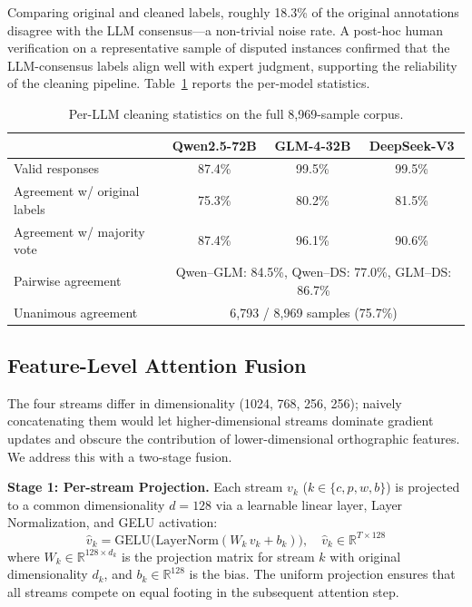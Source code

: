 ﻿\documentclass[12pt]{article}
\begin{document}
Comparing original and cleaned labels, roughly 18.3\% of the original annotations disagree with the LLM consensus---a non-trivial noise rate. A post-hoc human verification on a representative sample of disputed instances confirmed that the LLM-consensus labels align well with expert judgment, supporting the reliability of the cleaning pipeline. Table~\ref{tab:llm-stats} reports the per-model statistics.

\begin{table}[htbp]
\centering
\caption{Per-LLM cleaning statistics on the full 8{,}969-sample corpus.}
\label{tab:llm-stats}
\begin{tabular}{lccc}
\toprule
 & Qwen2.5-72B & GLM-4-32B & DeepSeek-V3 \\
\midrule
Valid responses & 87.4\% & 99.5\% & 99.5\% \\
Agreement w/ original labels & 75.3\% & 80.2\% & 81.5\% \\
Agreement w/ majority vote & 87.4\% & 96.1\% & 90.6\% \\
\midrule
Pairwise agreement & \multicolumn{3}{c}{Qwen--GLM: 84.5\%, Qwen--DS: 77.0\%, GLM--DS: 86.7\%} \\
Unanimous agreement & \multicolumn{3}{c}{6{,}793 / 8{,}969 samples (75.7\%)} \\
\bottomrule
\end{tabular}
\end{table}
\subsection{Feature-Level Attention Fusion}
\label{sec:attention-fusion}
The four streams differ in dimensionality (1024, 768, 256, 256); naively concatenating them would let higher-dimensional streams dominate gradient updates and obscure the contribution of lower-dimensional orthographic features. We address this with a two-stage fusion.

\textbf{Stage 1: Per-stream Projection.} Each stream $v_k$ ($k \in \{c, p, w, b\}$) is projected to a common dimensionality $d = 128$ via a learnable linear layer, Layer Normalization, and GELU activation:
\[
\hat{v}_k = \mathrm{GELU}\bigl(\mathrm{LayerNorm}(W_k \, v_k + b_k)\bigr), \quad \hat{v}_k \in \mathbb{R}^{T \times 128}
\]
where $W_k \in \mathbb{R}^{128 \times d_k}$ is the projection matrix for stream $k$ with original dimensionality $d_k$, and $b_k \in \mathbb{R}^{128}$ is the bias. The uniform projection ensures that all streams compete on equal footing in the subsequent attention step.
\end{document}
